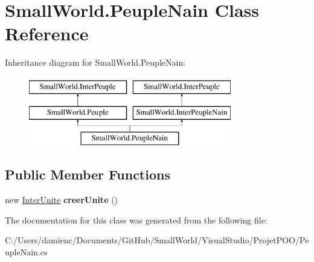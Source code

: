 \hypertarget{class_small_world_1_1_peuple_nain}{\section{Small\-World.\-Peuple\-Nain Class Reference}
\label{class_small_world_1_1_peuple_nain}
}
Inheritance diagram for Small\-World.\-Peuple\-Nain\-:\begin{figure}[H]
\begin{center}
\leavevmode
\includegraphics[height=3.000000cm]{class_small_world_1_1_peuple_nain}
\end{center}
\end{figure}
\subsection*{Public Member Functions}
\begin{DoxyCompactItemize}
\item 
\hypertarget{class_small_world_1_1_peuple_nain_ad200f4e7930232ab7ab89317795b8ee2}{new \hyperlink{interface_small_world_1_1_inter_unite}{Inter\-Unite} {\bfseries creer\-Unite} ()}\label{class_small_world_1_1_peuple_nain_ad200f4e7930232ab7ab89317795b8ee2}

\end{DoxyCompactItemize}


The documentation for this class was generated from the following file\-:\begin{DoxyCompactItemize}
\item 
C\-:/\-Users/damienc/\-Documents/\-Git\-Hub/\-Small\-World/\-Visual\-Studio/\-Projet\-P\-O\-O/Peuple\-Nain.\-cs\end{DoxyCompactItemize}
